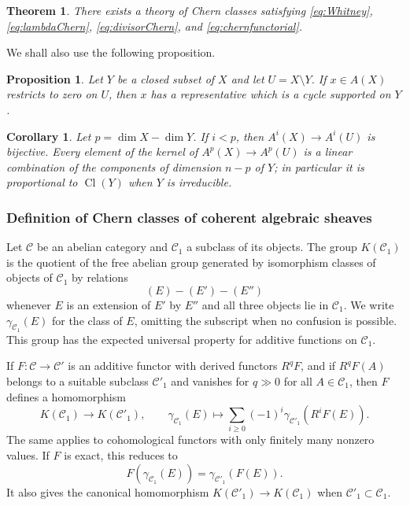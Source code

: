 \documentclass[14pt]{extarticle}
\newcommand{\cC}{\mathcal C}
\newcommand{\Cl}{\operatorname{Cl}}
\newtheorem*{theorem*}{Theorem}
\newtheorem*{proposition*}{Proposition}
\newtheorem*{corollary*}{Corollary}
\begin{document}
\begin{theorem*}
There exists a theory of Chern classes satisfying \eqref{eq:Whitney}, \eqref{eq:lambdaChern}, \eqref{eq:divisorChern}, and \eqref{eq:chernfunctorial}.
\end{theorem*}

We shall also use the following proposition.

\begin{proposition*}
Let $Y$ be a closed subset of $X$ and let $U=X\setminus Y$. If $x\in A(X)$ restricts to zero on $U$, then $x$ has a representative which is a cycle supported on $Y$.
\end{proposition*}

\begin{corollary*}
Let $p=\dim X-\dim Y$. If $i<p$, then $A^i(X)\to A^i(U)$ is bijective. Every element of the kernel of $A^p(X)\to A^p(U)$ is a linear combination of the components of dimension $n-p$ of $Y$; in particular it is proportional to $\Cl(Y)$ when $Y$ is irreducible.
\end{corollary*}

\subsubsection{Definition of Chern classes of coherent algebraic sheaves}

Let $\cC$ be an abelian category and $\cC_1$ a subclass of its objects. The group $K(\cC_1)$ is the quotient of the free abelian group generated by isomorphism classes of objects of $\cC_1$ by relations
\[
   (E)-(E')-(E'')
\]
whenever $E$ is an extension of $E'$ by $E''$ and all three objects lie in $\cC_1$. We write $\gamma_{\cC_1}(E)$ for the class of $E$, omitting the subscript when no confusion is possible. This group has the expected universal property for additive functions on $\cC_1$.

If $F:\cC\to\cC'$ is an additive functor with derived functors $R^qF$, and if $R^qF(A)$ belongs to a suitable subclass $\cC'_1$ and vanishes for $q\gg0$ for all $A\in\cC_1$, then $F$ defines a homomorphism
\begin{equation}\label{eq:derivedKfunctor}
   K(\cC_1)\to K(\cC'_1),
   \qquad
   \gamma_{\cC_1}(E)\mapsto
   \sum_{i\geq0}(-1)^i\gamma_{\cC'_1}(R^iF(E)).
\end{equation}
The same applies to cohomological functors with only finitely many nonzero values. If $F$ is exact, this reduces to
\[
   F(\gamma_{\cC_1}(E))=\gamma_{\cC'_1}(F(E)).
\]
It also gives the canonical homomorphism $K(\cC'_1)\to K(\cC_1)$ when $\cC'_1\subset\cC_1$.
\end{document}
